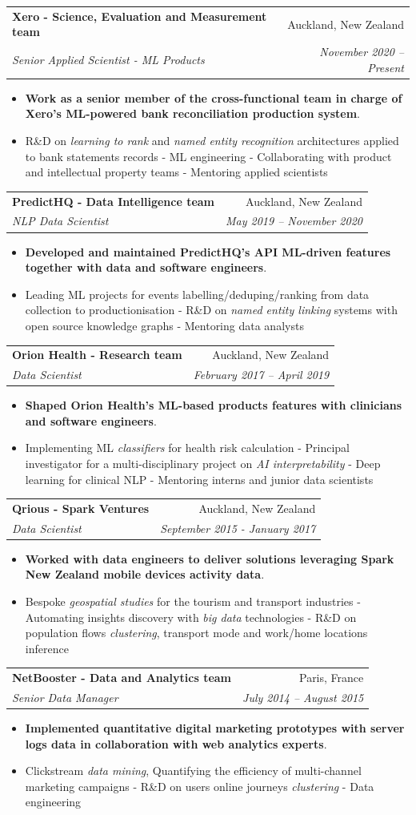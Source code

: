 \documentclass[letterpaper,11pt]{article}
\makeatletter
\newcommand{\resumeItemBis}[2]{
  \item\small{
    \textbf{#1}{#2 \vspace{-2pt}}
  }
}
\newcommand{\resumeSubheading}[4]{
  \vspace{-1pt}\item
    \begin{tabular*}{0.97\textwidth}[t]{l@{\extracolsep{\fill}}r}
      \textbf{#1} & #2 \\
      \textit{\small#3} & \textit{\small #4} \\
    \end{tabular*}\vspace{-5pt}
}
\newcommand{\resumeItemListStart}{\begin{itemize}}
\newcommand{\resumeItemListEnd}{\end{itemize}\vspace{-5pt}}
\makeatother
\begin{document}
	\resumeSubheading
      {Xero - Science, Evaluation and Measurement team}{Auckland, New Zealand}
      {Senior Applied Scientist - ML Products}{November 2020 -- Present}
      \resumeItemListStart
        \resumeItemBis{Work as a senior member of the cross-functional team in charge of Xero's ML-powered bank reconciliation production system}{.}
         \resumeItemBis{} {R\&D on \emph{learning to rank} and \emph{named entity recognition} architectures applied to bank statements records - ML engineering - Collaborating with product and intellectual property teams - Mentoring applied scientists}
           \resumeItemListEnd

	\resumeSubheading
      {PredictHQ - Data Intelligence team}{Auckland, New Zealand}
      {NLP Data Scientist}{May 2019 -- November 2020}
      \resumeItemListStart
        \resumeItemBis{Developed and maintained PredictHQ's API ML-driven features together with data and software engineers}{.}
            \resumeItemBis{} {Leading ML projects for events labelling/deduping/ranking from data collection to productionisation - R\&D on \emph{named entity linking} systems with open source knowledge graphs - Mentoring data analysts}
           \resumeItemListEnd	
	
    \resumeSubheading
      {Orion Health - Research team}{Auckland, New Zealand}
      {Data Scientist}{February 2017 -- April 2019}
      \resumeItemListStart
        \resumeItemBis{Shaped Orion Health's ML-based products features with clinicians and software engineers}{.}
            \resumeItemBis{} {Implementing ML \emph{classifiers} for health risk calculation - Principal investigator for a multi-disciplinary project on \emph{AI interpretability} - Deep learning for clinical NLP - Mentoring interns and junior data scientists}
           \resumeItemListEnd

    \resumeSubheading
      {Qrious - Spark Ventures}{Auckland, New Zealand}
      {Data Scientist}{September 2015 - January 2017}
      \resumeItemListStart
        \resumeItemBis{Worked with data engineers to deliver solutions leveraging Spark New Zealand mobile devices activity data}{.}
            \resumeItemBis{} {Bespoke \emph{geospatial studies} for the tourism and transport industries - Automating insights discovery with \emph{big data} technologies - R\&D on population flows \emph{clustering}, transport mode and work/home locations inference}
           \resumeItemListEnd

    \resumeSubheading
      {NetBooster - Data and Analytics team}{Paris, France}
      {Senior Data Manager}{July 2014 -- August 2015}
        \resumeItemListStart
        \resumeItemBis{Implemented quantitative digital marketing prototypes with server logs data in collaboration with web analytics experts}{.}
            \resumeItemBis{} {Clickstream \emph{data mining}, Quantifying the efficiency of multi-channel marketing campaigns - R\&D on users online journeys \emph{clustering} - Data engineering}
           \resumeItemListEnd
\end{document}

